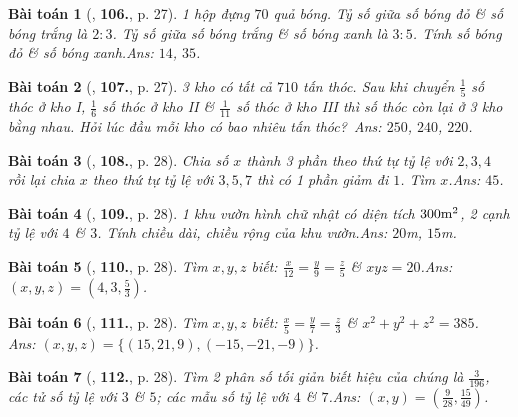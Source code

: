 \documentclass{article}
\newtheorem{baitoan}{Bài toán}
\begin{document}
\begin{baitoan}[\cite{Tuyen_Toan_7}, \textbf{106.}, p. 27]
	1 hộp đựng $70$ quả bóng. Tỷ số giữa số bóng đỏ \& số bóng trắng là $2:3$. Tỷ số giữa số bóng trắng \& số bóng xanh là $3:5$. Tính số bóng đỏ \& số bóng xanh.\hfill{\sf Ans:} $14$, $35$.
\end{baitoan}

\begin{baitoan}[\cite{Tuyen_Toan_7}, \textbf{107.}, p. 27]
	3 kho có tất cả $710$ tấn thóc. Sau khi chuyển $\frac{1}{5}$ số thóc ở kho I, $\frac{1}{6}$ số thóc ở kho II \& $\frac{1}{11}$ số thóc ở kho III thì số thóc còn lại ở 3 kho bằng nhau. Hỏi lúc đầu mỗi kho có bao nhiêu tấn thóc?\ \hfill{\sf Ans:} $250$, $240$, $220$.
\end{baitoan}

\begin{baitoan}[\cite{Tuyen_Toan_7}, \textbf{108.}, p. 28]
	Chia số $x$ thành 3 phần theo thứ tự tỷ lệ với $2,3,4$ rồi lại chia $x$ theo thứ tự tỷ lệ với $3,5,7$ thì có 1 phần giảm đi $1$. Tìm $x$.\hfill{\sf Ans:} $45$.
\end{baitoan}

\begin{baitoan}[\cite{Tuyen_Toan_7}, \textbf{109.}, p. 28]
	1 khu vườn hình chữ nhật có diện tích $\rm300m^2$, 2 cạnh tỷ lệ với $4$ \& $3$. Tính chiều dài, chiều rộng của khu vườn.\hfill{\sf Ans:} $20$\emph{m}, $15$\emph{m}.
\end{baitoan}

\begin{baitoan}[\cite{Tuyen_Toan_7}, \textbf{110.}, p. 28]
	Tìm $x,y,z$ biết: $\frac{x}{12} = \frac{y}{9} = \frac{z}{5}$ \& $xyz = 20$.\hfill{\sf Ans:} $(x,y,z) = \left(4,3,\frac{5}{3}\right)$.
\end{baitoan}

\begin{baitoan}[\cite{Tuyen_Toan_7}, \textbf{111.}, p. 28]
	Tìm $x,y,z$ biết: $\frac{x}{5} = \frac{y}{7} = \frac{z}{3}$ \& $x^2 + y^2 + z^2 = 385$.\\\mbox{}\hfill{\sf Ans:} $(x,y,z) = \{(15,21,9),(-15,-21,-9)\}$.
\end{baitoan}

\begin{baitoan}[\cite{Tuyen_Toan_7}, \textbf{112.}, p. 28]
	Tìm 2 phân số tối giản biết hiệu của chúng là $\frac{3}{196}$, các tử số tỷ lệ với $3$ \& $5$; các mẫu số tỷ lệ với $4$ \& $7$.\hfill{\sf Ans:} $(x,y) = \left(\frac{9}{28},\frac{15}{49}\right)$.
\end{baitoan}
\end{document}
